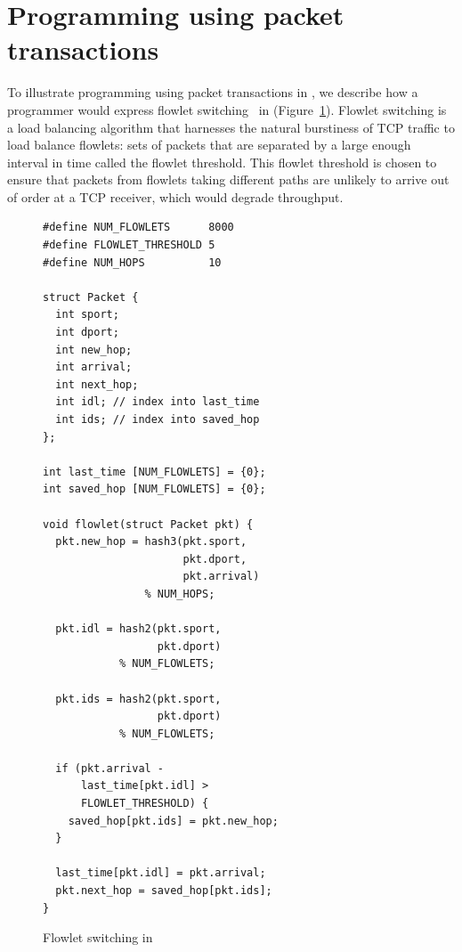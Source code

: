 \section{Programming using packet transactions}
\label{s:transactions}

To illustrate programming using packet transactions in \pktlanguage, we
describe how a programmer would express flowlet switching~\cite{flowlets} in
\pktlanguage (Figure~\ref{fig:flowlet}).  Flowlet switching is a load balancing
algorithm that harnesses the natural burstiness of TCP traffic to load balance
flowlets: sets of packets that are separated by a large enough interval in time
called the flowlet threshold.  This flowlet threshold is chosen to ensure that
packets from flowlets taking different paths are unlikely to arrive out of
order at a TCP receiver, which would degrade throughput.

\begin{figure}[!h]
\begin{small}
  \begin{lstlisting}[style=customc]
#define NUM_FLOWLETS      8000
#define FLOWLET_THRESHOLD 5
#define NUM_HOPS          10

struct Packet {
  int sport;
  int dport;
  int new_hop;
  int arrival;
  int next_hop;
  int idl; // index into last_time
  int ids; // index into saved_hop
};

int last_time [NUM_FLOWLETS] = {0};
int saved_hop [NUM_FLOWLETS] = {0};

void flowlet(struct Packet pkt) {
  pkt.new_hop = hash3(pkt.sport,
                      pkt.dport,
                      pkt.arrival)
                % NUM_HOPS;

  pkt.idl = hash2(pkt.sport,
                  pkt.dport)
            % NUM_FLOWLETS;

  pkt.ids = hash2(pkt.sport,
                  pkt.dport)
            % NUM_FLOWLETS;

  if (pkt.arrival -
      last_time[pkt.idl] >
      FLOWLET_THRESHOLD) {
    saved_hop[pkt.ids] = pkt.new_hop;
  }

  last_time[pkt.idl] = pkt.arrival;
  pkt.next_hop = saved_hop[pkt.ids];
}
\end{lstlisting}
\end{small}
\caption{Flowlet switching in \pktlanguage}
\label{fig:flowlet}
\end{figure}

